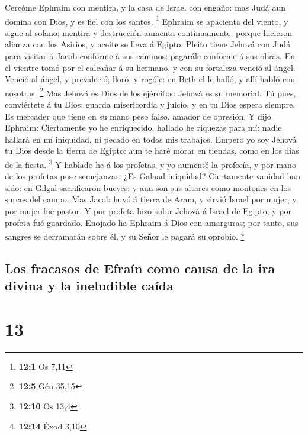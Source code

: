 Cercóme Ephraim con mentira, y la casa de Israel con
engaño: mas Judá aun domina con Dios, y es fiel con los santos.
\footnote{\textbf{12:1} Os 7,11}  Ephraim se apacienta del
viento, y sigue al solano: mentira y destrucción aumenta continuamente;
porque hicieron alianza con los Asirios, y aceite se lleva á Egipto.
 Pleito tiene Jehová con Judá para visitar á Jacob
conforme á sus caminos: pagarále conforme á sus obras.  En
el vientre tomó por el calcañar á su hermano, y con su fortaleza venció
al ángel.  Venció al ángel, y prevaleció; lloró, y rogóle:
en Beth-el le halló, y allí habló con nosotros. \footnote{\textbf{12:5}
  Gén 35,15}  Mas Jehová es Dios de los ejércitos: Jehová
es su memorial.  Tú pues, conviértete á tu Dios: guarda
misericordia y juicio, y en tu Dios espera siempre.  Es
mercader que tiene en su mano peso falso, amador de opresión.
 Y dijo Ephraim: Ciertamente yo he enriquecido, hallado he
riquezas para mí: nadie hallará en mí iniquidad, ni pecado en todos mis
trabajos.  Empero yo soy Jehová tu Dios desde la tierra
de Egipto: aun te haré morar en tiendas, como en los días de la fiesta.
\footnote{\textbf{12:10} Os 13,4}  Y hablado he á los
profetas, y yo aumenté la profecía, y por mano de los profetas puse
semejanzas.  ¿Es Galaad iniquidad? Ciertamente vanidad
han sido: en Gilgal sacrificaron bueyes: y aun son sus altares como
montones en los surcos del campo.  Mas Jacob huyó á
tierra de Aram, y sirvió Israel por mujer, y por mujer fué pastor.
 Y por profeta hizo subir Jehová á Israel de Egipto, y
por profeta fué guardado. Enojado ha Ephraim á Dios con amarguras; por
tanto, sus sangres se derramarán sobre él, y su Señor le pagará su
oprobio. \footnote{\textbf{12:14} Éxod 3,10}

\hypertarget{los-fracasos-de-efrauxedn-como-causa-de-la-ira-divina-y-la-ineludible-cauxedda}{%
\subsection{Los fracasos de Efraín como causa de la ira divina y la
ineludible
caída}\label{los-fracasos-de-efrauxedn-como-causa-de-la-ira-divina-y-la-ineludible-cauxedda}}

\hypertarget{section-12}{%
\section{13}\label{section-12}}

